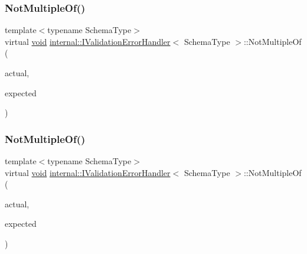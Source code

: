 \subsubsection{\texorpdfstring{Not\+Multiple\+Of()}{NotMultipleOf()}\hspace{0.1cm}{\footnotesize\ttfamily [1/3]}}
{\footnotesize\ttfamily template$<$typename Schema\+Type$>$ \\
virtual \hyperlink{imgui__impl__opengl3__loader_8h_ac668e7cffd9e2e9cfee428b9b2f34fa7}{void} \hyperlink{classinternal_1_1IValidationErrorHandler}{internal\+::\+I\+Validation\+Error\+Handler}$<$ Schema\+Type $>$\+::Not\+Multiple\+Of (\begin{DoxyParamCaption}\item[{\hyperlink{stdint_8h_a414156feea104f8f75b4ed9e3121b2f6}{int64\+\_\+t}}]{actual,  }\item[{const \hyperlink{classinternal_1_1IValidationErrorHandler_a22eda6c4ea9537f1ba00d76af052649a}{S\+Value} \&}]{expected }\end{DoxyParamCaption})\hspace{0.3cm}{\ttfamily [pure virtual]}}

\mbox{\label{classinternal_1_1IValidationErrorHandler_ad8bd123f154f4c39f48b366219878526}} 
\subsubsection{\texorpdfstring{Not\+Multiple\+Of()}{NotMultipleOf()}\hspace{0.1cm}{\footnotesize\ttfamily [2/3]}}
{\footnotesize\ttfamily template$<$typename Schema\+Type$>$ \\
virtual \hyperlink{imgui__impl__opengl3__loader_8h_ac668e7cffd9e2e9cfee428b9b2f34fa7}{void} \hyperlink{classinternal_1_1IValidationErrorHandler}{internal\+::\+I\+Validation\+Error\+Handler}$<$ Schema\+Type $>$\+::Not\+Multiple\+Of (\begin{DoxyParamCaption}\item[{\hyperlink{stdint_8h_aec6fcb673ff035718c238c8c9d544c47}{uint64\+\_\+t}}]{actual,  }\item[{const \hyperlink{classinternal_1_1IValidationErrorHandler_a22eda6c4ea9537f1ba00d76af052649a}{S\+Value} \&}]{expected }\end{DoxyParamCaption})\hspace{0.3cm}{\ttfamily [pure virtual]}}


